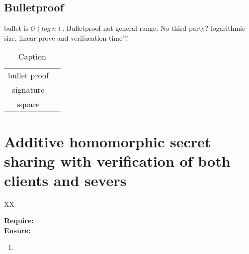 \subsection{Bulletproof}
bullet is $\mathcal{O}(log\:n)$. Bulletproof not general range. No third party?
 logarithmic size, linear prove and verifucation time'? 


\begin{table}[]
    \centering
    \begin{tabular}{c|c}
         bullet proof & \\
        signature  & \\
        square & \\
    \end{tabular}
    \caption{Caption}
    \label{tab:my_label}
\end{table}


\section{Additive homomorphic secret sharing with verification of both clients and severs }
\begin{algorithm}[H]
\caption{XX}
\textbf{Require:} \\
\textbf{Ensure:} 
\\\hrulefill
\begin{enumerate}
  \item 
\end{enumerate}
\label{alg: 2D esprit}
\end{algorithm}
